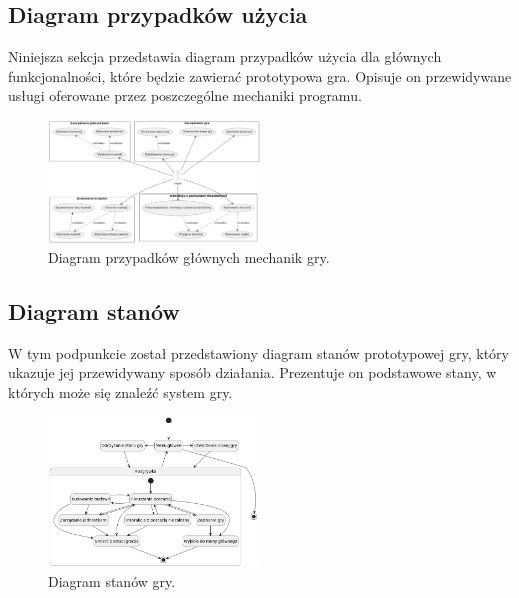 \subsection{Diagram przypadków użycia}\label{ss:usecase}
Niniejsza sekcja przedstawia diagram przypadków użycia dla głównych funkcjonalności, które będzie zawierać prototypowa gra.
Opisuje on przewidywane usługi oferowane przez poszczególne mechaniki programu.
\begin{figure}[htbp]
    \centering
    \includegraphics[width=0.5\textwidth]{images/diagrams/usecase.png}
    \caption{Diagram przypadków głównych mechanik gry.}\label{fig:usecases}
\end{figure}

\subsection{Diagram stanów}\label{ss:state}
W tym podpunkcie został przedstawiony diagram stanów prototypowej gry, który ukazuje jej przewidywany sposób działania.
Prezentuje on podstawowe stany, w których może się znaleźć system gry.
\begin{figure}[htbp]
    \centering
    \includegraphics[width=0.5\textwidth]{images/diagrams/state.png}
    \caption{Diagram stanów gry.}\label{fig:states}
\end{figure}

